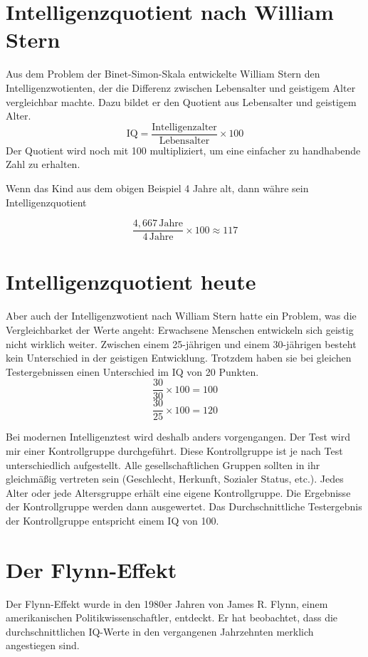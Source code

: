 \section{Intelligenzquotient nach William Stern}
Aus dem Problem der Binet-Simon-Skala entwickelte William Stern den Intelligenzwotienten, der die Differenz zwischen Lebensalter und geistigem Alter vergleichbar machte. Dazu bildet er den Quotient aus Lebensalter und geistigem Alter.
$$ \mathrm{IQ} = \frac{\mathrm{Intelligenzalter}}{\mathrm{Lebensalter}} \times 100 $$
Der Quotient wird noch mit 100 multipliziert, um eine einfacher zu handhabende Zahl zu erhalten.

Wenn das Kind aus dem obigen Beispiel 4 Jahre alt, dann währe sein Intelligenzquotient

$$ \frac{4,667\,\mathrm{Jahre}}{4\,\mathrm{Jahre}} \times 100 \approx 117 $$

\section{Intelligenzquotient heute}
Aber auch der Intelligenzwotient nach William Stern hatte ein Problem, was die Vergleichbarket der Werte angeht: Erwachsene Menschen entwickeln sich geistig nicht wirklich weiter. Zwischen einem 25-jährigen und einem 30-jährigen besteht kein Unterschied in der geistigen Entwicklung. Trotzdem haben sie bei gleichen Testergebnissen einen Unterschied im IQ von 20 Punkten.
$$ \frac{30}{30} \times 100 = 100 $$
$$ \frac{30}{25} \times 100 = 120 $$

Bei modernen Intelligenztest wird deshalb anders vorgengangen. Der Test wird mir einer Kontrollgruppe durchgeführt. Diese Kontrollgruppe ist je nach Test unterschiedlich aufgestellt. Alle gesellschaftlichen Gruppen sollten in ihr gleichmäßig vertreten sein (Geschlecht, Herkunft, Sozialer Status, etc.). Jedes Alter oder jede Altersgruppe erhält eine eigene Kontrollgruppe. Die Ergebnisse der Kontrollgruppe werden dann ausgewertet. Das Durchschnittliche Testergebnis der Kontrollgruppe entspricht einem IQ von 100.

\section{Der Flynn-Effekt}
\label{sec:flynn}

Der Flynn-Effekt wurde in den 1980er Jahren von James R. Flynn, einem amerikanischen Politikwissenschaftler, entdeckt. Er hat beobachtet, dass die durchschnittlichen IQ-Werte in den vergangenen Jahrzehnten merklich angestiegen sind.

